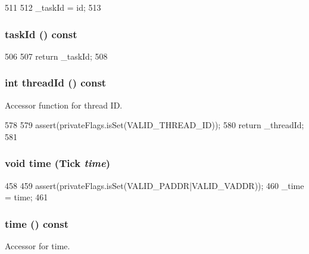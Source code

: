 \begin{DoxyCode}
511                         {
512         _taskId = id;
513     }
\end{DoxyCode}
\hypertarget{classRequest_a7abf15d67b3fbd53236fde58eecb3f34}{
\subsubsection[{taskId}]{ taskId () const}}
\label{classRequest_a7abf15d67b3fbd53236fde58eecb3f34}



\begin{DoxyCode}
506     {
507         return _taskId;
508     }
\end{DoxyCode}
\hypertarget{classRequest_afc38d04c77e7b5fc3bbb0dd00fc87742}{
\subsubsection[{threadId}]{\setlength{\rightskip}{0pt plus 5cm}int threadId () const}}
\label{classRequest_afc38d04c77e7b5fc3bbb0dd00fc87742}
Accessor function for thread ID. 


\begin{DoxyCode}
578     {
579         assert(privateFlags.isSet(VALID_THREAD_ID));
580         return _threadId;
581     }
\end{DoxyCode}
\hypertarget{classRequest_a16d60ed54e8670a5cf18b0fe19551768}{
\subsubsection[{time}]{\setlength{\rightskip}{0pt plus 5cm}void time ({\bf Tick} {\em time})}}
\label{classRequest_a16d60ed54e8670a5cf18b0fe19551768}



\begin{DoxyCode}
458     {
459         assert(privateFlags.isSet(VALID_PADDR|VALID_VADDR));
460         _time = time;
461     }
\end{DoxyCode}
\hypertarget{classRequest_aaaea92a2d64ddb509862dd876becf90b}{
\subsubsection[{time}]{ time () const}}
\label{classRequest_aaaea92a2d64ddb509862dd876becf90b}
Accessor for time. 


